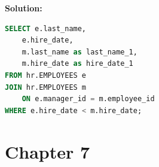 \documentclass[a4paper,12pt]{article}
\begin{document}
\begin{enumerate}
    \textbf{Solution: }
    \begin{lstlisting}[language=SQL]
SELECT e.last_name,
    e.hire_date,
    m.last_name as last_name_1,
    m.hire_date as hire_date_1
FROM hr.EMPLOYEES e
JOIN hr.EMPLOYEES m 
	ON e.manager_id = m.employee_id
WHERE e.hire_date < m.hire_date;
    \end{lstlisting}
\end{enumerate}

\newpage










\section*{Chapter 7}
\end{document}
